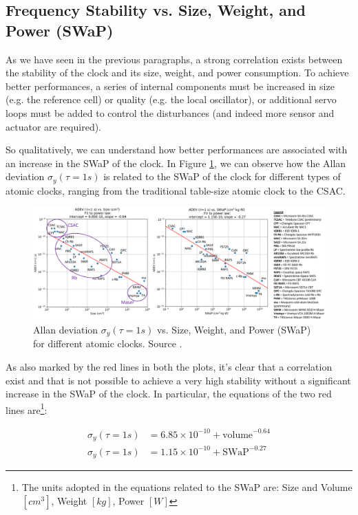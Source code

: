 \subsection{Frequency Stability vs. Size, Weight, and Power (SWaP)}
\label{subsec:stability_vs_SWaP}

As we have seen in the previous paragraphs, a strong correlation exists between the stability of the clock and its size, weight, and power consumption.
To achieve better performances, a series of internal components must be increased in size (e.g. the reference cell) or quality (e.g. the local oscillator), or additional servo loops must be added to control the disturbances (and indeed more sensor and actuator are required).

So qualitatively, we can understand how better performances are associated with an increase in the SWaP of the clock.
In Figure \ref{fig:ADEV_vs_SWaP}, we can observe how the Allan deviation $\sigma_y(\tau=1s)$ is related to the SWaP of the clock for different types of atomic clocks, ranging from the traditional table-size atomic clock to the CSAC.

\begin{figure}[H]
    \centering
    \includegraphics[width=\textwidth, max width=\linewidth]{img/ADEV_vs_SWaP.png}
    \caption{Allan deviation $\sigma_y(\tau=1s)$ vs. Size, Weight, and Power (SWaP) for different atomic clocks. Source \cite{Scherer}.}
    \label{fig:ADEV_vs_SWaP}
\end{figure}

As also marked by the red lines in both the plots, it's clear that a correlation exist and that is not possible to achieve a very high stability without a significant increase in the SWaP of the clock.
In particular, the equations of the two red lines are\footnote{The units adopted in the equations related to the SWaP are: Size and Volume $[cm^3]$, Weight $[kg]$, Power $[W]$}:

\begin{align}
    \sigma_y(\tau=1s) & = 6.85 \times 10^{-10} + \text{volume}^{-0.64} \\
    \sigma_y(\tau=1s) & = 1.15 \times 10^{-10} + \text{SWaP}^{-0.27}
\end{align}


